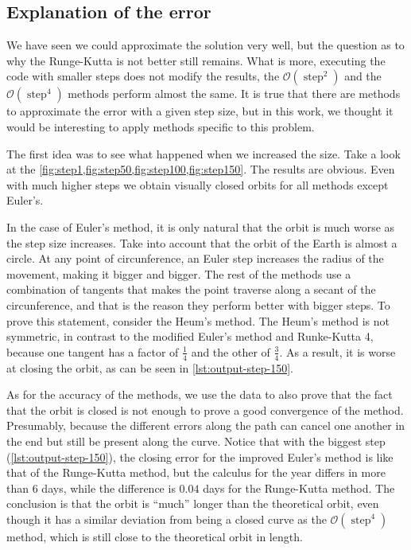 \documentclass[12pt, onside]{article}
\begin{document}
\subsection{Explanation of the error}

    We have seen we could approximate the solution very well,
but the question as to why the Runge-Kutta is not better still remains.
What is more, executing the code with smaller steps does not modify the results,
the $\mathcal{O}(\operatorname{step}^2)$ and the $\mathcal{O}(\operatorname{step}^4)$ methods
perform almost the same.
It is true that there are methods to approximate the error with a given step size,
but in this work,
we thought it would be interesting to apply methods specific to this problem.

    The first idea was to see what happened when we increased the size.
Take a look at the \cref{fig:step1,fig:step50,fig:step100,fig:step150}.
The results are obvious.
Even with much higher steps we obtain visually closed orbits for all methods except Euler's.

    In the case of Euler's method, it is only natural that
the orbit is much worse as the step size increases.
Take into account that the orbit of the Earth is almost a circle.
At any point of circunference, an Euler step increases the radius of the movement,
making it bigger and bigger.
The rest of the methods use a combination of tangents that makes the point
traverse along a secant of the circunference,
and that is the reason they perform better with bigger steps.
To prove this statement, consider the Heum's method.
The Heum's method is not symmetric,
in contrast to the modified Euler's method and Runke-Kutta 4,
because one tangent has a factor of $\frac{1}{4}$ and the other of $\frac{3}{4}$.
As a result, it is worse at closing the orbit, as can be seen in \cref{lst:output-step-150}.

    As for the accuracy of the methods,
we use the data to also prove that the fact that the orbit is closed is not enough to prove
a good convergence of the method.
Presumably, because the different errors along the path can cancel one another in the end
but still be present along the curve.
Notice that with the biggest step (\cref{lst:output-step-150}),
the closing error for the improved Euler's method is like that of the Runge-Kutta method,
but the calculus for the year differs in more than $6$ days,
while the difference is $0.04$ days for the Runge-Kutta method.
The conclusion is that the orbit is ``much'' longer than the theoretical orbit,
even though it has a similar deviation from being a closed curve as
the $\mathcal{O}(\operatorname{step}^4)$ method,
which is still close to the theoretical orbit in length.
\end{document}
